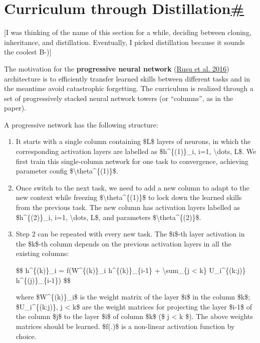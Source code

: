 \section{\texorpdfstring{Curriculum through Distillation\hyperref[curriculum-through-distillation]{\#}}{Curriculum through Distillation\#}}\label{curriculum-through-distillation}

{[}I was thinking of the name of this section for a while, deciding between cloning, inheritance, and distillation. Eventually, I picked distillation because it sounds the coolest B-){]}

The motivation for the \textbf{progressive neural network} (\href{https://arxiv.org/abs/1606.04671}{Rusu et al. 2016}) architecture is to efficiently transfer learned skills between different tasks and in the meantime avoid catastrophic forgetting. The curriculum is realized through a set of progressively stacked neural network towers (or ``columns'', as in the paper).

A progressive network has the following structure:

\begin{enumerate}
\item
  It starts with a single column containing \$L\$ layers of neurons, in which the corresponding activation layers are labelled as \$h\^{}\{(1)\}\_i, i=1, \textbackslash dots, L\$. We first train this single-column network for one task to convergence, achieving parameter config \$\textbackslash theta\^{}\{(1)\}\$.
\item
  Once switch to the next task, we need to add a new column to adapt to the new context while freezing \$\textbackslash theta\^{}\{(1)\}\$ to lock down the learned skills from the previous task. The new column has activation layers labelled as \$h\^{}\{(2)\}\_i, i=1, \textbackslash dots, L\$, and parameters \$\textbackslash theta\^{}\{(2)\}\$.
\item
  Step 2 can be repeated with every new task. The \$i\$-th layer activation in the \$k\$-th column depends on the previous activation layers in all the existing columns:

  \$\$ h\^{}\{(k)\}\_i = f(W\^{}\{(k)\}\_i h\^{}\{(k)\}\_\{i-1\} + \textbackslash sum\_\{j \textless{} k\} U\_i\^{}\{(k:j)\} h\^{}\{(j)\}\_\{i-1\}) \$\$

  where \$W\^{}\{(k)\}\_i\$ is the weight matrix of the layer \$i\$ in the column \$k\$; \$U\_i\^{}\{(k:j)\}, j \textless{} k\$ are the weight matrices for projecting the layer \$i-1\$ of the column \$j\$ to the layer \$i\$ of column \$k\$ (\$ j \textless{} k \$). The above weights matrices should be learned. \$f(.)\$ is a non-linear activation function by choice.
\end{enumerate}

